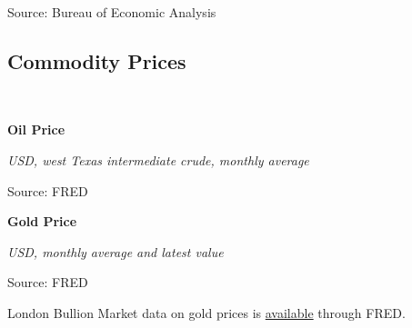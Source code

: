 \documentclass{report}
\makeatletter
\newcommand{\tbllink}[1]{\href{https://raw.githubusercontent.com/bdecon/US-chartbook/master/chartbook/data/#1}{\faTable}}
\newcommand*\short[1]{\expandafter\@gobbletwo\number\numexpr#1\relax}
\newcommand{\dateaxisticks}{
		date coordinates in=x, axis line style={draw=none},
		xmax={2020-08-10},
		max space between ticks=40,	    
		xtick={{1990-01-01}, {1992-01-01}, {1994-01-01}, 
			{1996-01-01}, {1998-01-01}, {2000-01-01}, 
			{2002-01-01}, {2004-01-01}, {2006-01-01},
			{2008-01-01}, {2010-01-01}, {2012-01-01}, {2014-01-01},
		    {2016-01-01}, {2018-01-01}, {2020-01-01}},
		minor xtick={{1989-01-01}, {1991-01-01}, {1993-01-01},
			{1995-01-01}, {1997-01-01}, {1999-01-01}, 
			{2001-01-01}, {2003-01-01}, {2005-01-01}, {2007-01-01},
		    {2009-01-01}, {2011-01-01}, {2013-01-01}, {2015-01-01},
		    {2017-01-01}, {2019-01-01}},
		enlarge y limits={0.06}, enlarge x limits={0.01},
		}
\newcommand{\shdateaxisticks}{
		date coordinates in=x, axis line style={draw=none},
		xmax={2021-01-01},
		max space between ticks=40,	    
		xtick={{1990-01-01}, {1995-01-01}, {2000-01-01}, 
			{2005-01-01}, {2010-01-01}, {2015-01-01}, {2020-01-01}},
		minor xtick={},
		enlarge y limits={0.06}, enlarge x limits={0.01},
		}
\newcommand{\bbar}[2]{extra #1 ticks = {{#2}}, extra #1 tick labels = ,
		extra #1 tick style = {grid=major, grid style={thick, black!25}},}
\newcommand{\stdline}[4]{\addplot[very thick, no markers, color=#1] 
		table [x=#2, y=#3, col sep=comma] {#4};	}
\newcommand{\rbars}{
		\fill[color=black!10] (axis cs:{1990-07-01},\pgfkeysvalueof{/pgfplots/ymin}) rectangle 
			(axis cs:{1991-03-01}, \pgfkeysvalueof{/pgfplots/ymax});
		\fill[color=black!10] (axis cs:{2007-12-01},\pgfkeysvalueof{/pgfplots/ymin}) rectangle 
			(axis cs:{2009-07-01}, \pgfkeysvalueof{/pgfplots/ymax});
		\fill[color=black!10] (axis cs:{2001-03-01},\pgfkeysvalueof{/pgfplots/ymin}) rectangle 
			(axis cs:{2001-11-01}, \pgfkeysvalueof{/pgfplots/ymax});
		\fill[color=black!10] (axis cs:{2020-02-01},\pgfkeysvalueof{/pgfplots/ymin}) rectangle 
			(axis cs:{2020-09-01}, \pgfkeysvalueof{/pgfplots/ymax});}
\makeatother
\begin{document}
{{{{{{{{{\begin{minipage}{0.76\textwidth}
\footnotesize{Source: Bureau of Economic Analysis} \hfill \tbllink{pce_pi.csv}

\end{minipage}

\newpage

\subsection*{\color{black!70} \seriffont Commodity Prices}
\begin{minipage}{0.76\textwidth}
\small \\

\vspace{1mm}

\normalsize \textbf{Oil Price}

\footnotesize{\textit{USD, west Texas intermediate crude, monthly average}}

\hspace*{-2mm} 

\footnotesize{Source: FRED} \hfill \tbllink{wti.csv}
\end{minipage}

\vspace{10mm}

\begin{minipage}{0.41\textwidth}
\normalsize \textbf{Gold Price}

\footnotesize{\textit{USD, monthly average and latest value}}

\hspace*{-2mm} 

\footnotesize{Source: FRED} \hfill \tbllink{gold.csv}
\end{minipage} \hspace{8mm}
\begin{minipage}{0.29\textwidth}
\small London Bullion Market data on gold prices is \href{https://fred.stlouisfed.org/series/GOLDAMGBD228NLBM}{available} through FRED. 
\end{minipage}
\newpage
\begin{minipage}{0.76\textwidth}


\end{minipage}}}}}}}}}}
\end{document}

